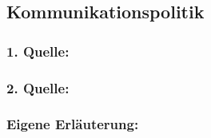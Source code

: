     \subsection{Kommunikationspolitik}
        \subsubsection*{1. Quelle:}
        \begin{abstract}
        \end{abstract}
        \subsubsection*{2. Quelle:}
        \begin{abstract}
        \end{abstract}
        \subsubsection*{Eigene Erläuterung:}
        \begin{abstract}
        \end{abstract}